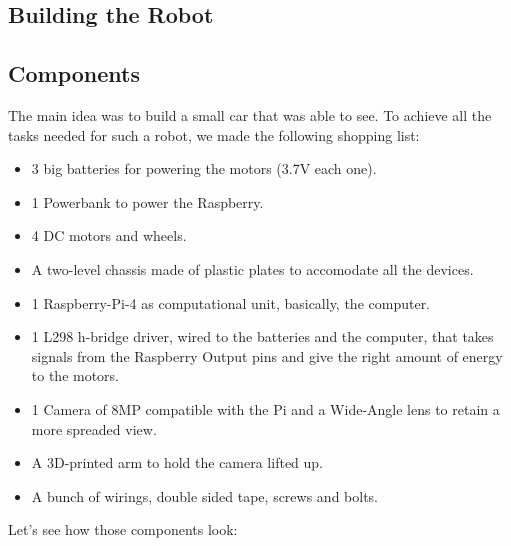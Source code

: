 \documentclass[12pt,a4paper]{article}
\begin{document}
\begin{large}
\section{Building the Robot}


\subsection{Components}

The main idea was to build a small car that was able to see. To achieve all the tasks needed for such a robot, we made the following shopping list: 
\begin{itemize}
  \item 3 big batteries for powering the motors (3.7V each one).
  \item 1 Powerbank to power the Raspberry.
  \item 4 DC motors and wheels.
  \item A two-level chassis made of plastic plates to accomodate all the devices.
  \item 1 Raspberry-Pi-4 as computational unit, basically, the computer.
  \item 1 L298 h-bridge driver, wired to the batteries and the computer, that takes signals from the Raspberry Output pins and give the right amount of energy to the motors.
  \item 1 Camera of 8MP compatible with the Pi and a Wide-Angle lens to retain a more spreaded view.
  \item A 3D-printed arm to hold the camera lifted up.
  \item A bunch of wirings, double sided tape, screws and bolts.
\end{itemize}
Let's see how those components look: 


\end{large}
\end{document}
